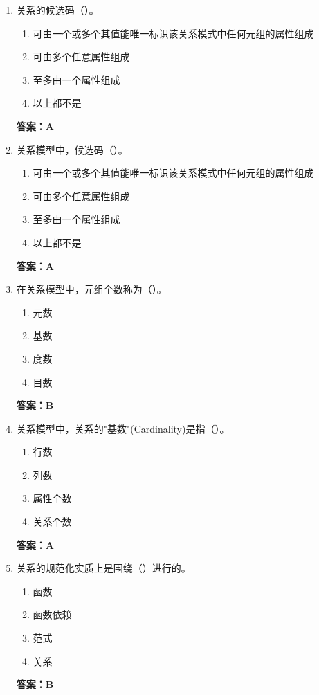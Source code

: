 \documentclass[12pt, a4paper]{article}
\begin{document}
\begin{enumerate}[label=\arabic*.]
	\item 关系的候选码（\quad）。
	      \begin{enumerate}
		      \item 可由一个或多个其值能唯一标识该关系模式中任何元组的属性组成
		      \item 可由多个任意属性组成
		      \item 至多由一个属性组成
		      \item 以上都不是
	      \end{enumerate}
	      \textbf{答案：A}

	\item 关系模型中，候选码（\quad）。
	      \begin{enumerate}
		      \item 可由一个或多个其值能唯一标识该关系模式中任何元组的属性组成
		      \item 可由多个任意属性组成
		      \item 至多由一个属性组成
		      \item 以上都不是
	      \end{enumerate}
	      \textbf{答案：A}

	\item 在关系模型中，元组个数称为（\quad）。
	      \begin{enumerate}
		      \item 元数
		      \item 基数
		      \item 度数
		      \item 目数
	      \end{enumerate}
	      \textbf{答案：B}

	\item 关系模型中，关系的"基数"(Cardinality)是指（\quad）。
	      \begin{enumerate}
		      \item 行数
		      \item 列数
		      \item 属性个数
		      \item 关系个数
	      \end{enumerate}
	      \textbf{答案：A}

	\item 关系的规范化实质上是围绕（\quad）进行的。
	      \begin{enumerate}
		      \item 函数
		      \item 函数依赖
		      \item 范式
		      \item 关系
	      \end{enumerate}
	      \textbf{答案：B}


\end{enumerate}
\end{document}
